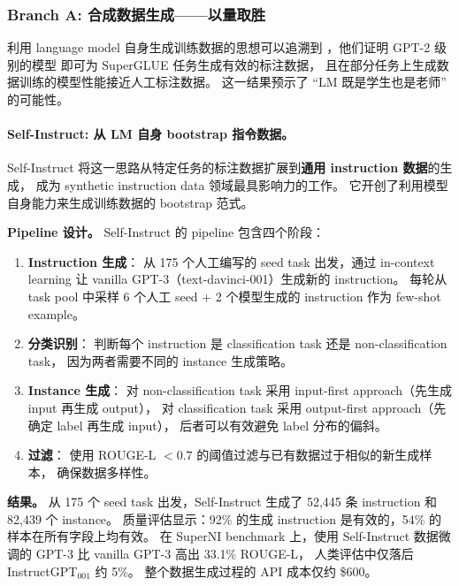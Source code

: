 \subsubsection{Branch A: 合成数据生成——以量取胜}
\label{sec:t1-synthetic}

利用 language model 自身生成训练数据的思想可以追溯到
\citet{schick2021generating}，他们证明 GPT-2 级别的模型
即可为 SuperGLUE 任务生成有效的标注数据，
且在部分任务上生成数据训练的模型性能接近人工标注数据。
这一结果预示了 ``LM 既是学生也是老师'' 的可能性。

\paragraph{Self-Instruct: 从 LM 自身 bootstrap 指令数据。}
Self-Instruct 将这一思路从特定任务的标注数据扩展到\textbf{通用 instruction 数据}的生成，
成为 synthetic instruction data 领域最具影响力的工作。
它开创了利用模型自身能力来生成训练数据的 bootstrap 范式。

\textbf{Pipeline 设计。}
Self-Instruct 的 pipeline 包含四个阶段：
\begin{enumerate}[leftmargin=1.5em]
  \item \textbf{Instruction 生成}：
    从 175 个人工编写的 seed task 出发，通过 in-context learning 让
    vanilla GPT-3（text-davinci-001）生成新的 instruction。
    每轮从 task pool 中采样 6 个人工 seed + 2 个模型生成的 instruction 作为 few-shot example。

  \item \textbf{分类识别}：
    判断每个 instruction 是 classification task 还是 non-classification task，
    因为两者需要不同的 instance 生成策略。

  \item \textbf{Instance 生成}：
    对 non-classification task 采用 input-first approach（先生成 input 再生成 output），
    对 classification task 采用 output-first approach（先确定 label 再生成 input），
    后者可以有效避免 label 分布的偏斜。

  \item \textbf{过滤}：
    使用 ROUGE-L $< 0.7$ 的阈值过滤与已有数据过于相似的新生成样本，
    确保数据多样性。
\end{enumerate}

\textbf{结果。}
从 175 个 seed task 出发，Self-Instruct 生成了 52,445 条 instruction 和 82,439 个 instance。
质量评估显示：92\% 的生成 instruction 是有效的，54\% 的样本在所有字段上均有效。
在 SuperNI benchmark 上，使用 Self-Instruct 数据微调的 GPT-3
比 vanilla GPT-3 高出 33.1\% ROUGE-L，
人类评估中仅落后 InstructGPT$_{\text{001}}$ 约 5\%。
整个数据生成过程的 API 成本仅约 \$600。

